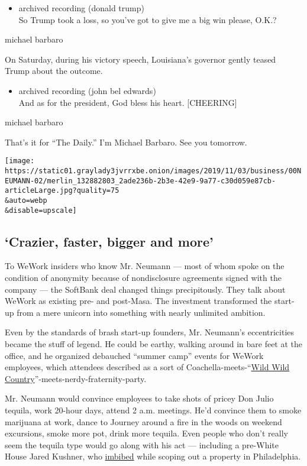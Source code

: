 \begin{itemize}
\tightlist
\item
  archived recording (donald trump)\\
  So Trump took a loss, so you've got to give me a big win please, O.K.?
\end{itemize}

michael barbaro

On Saturday, during his victory speech, Louisiana's governor gently
teased Trump about the outcome.

\begin{itemize}
\tightlist
\item
  archived recording (john bel edwards)\\
  And as for the president, God bless his heart. {[}CHEERING{]}
\end{itemize}

michael barbaro

That's it for ``The Daily.'' I'm Michael Barbaro. See you tomorrow.

\texttt{[image: https://static01.graylady3jvrrxbe.onion/images/2019/11/03/business/00NEUMANN-02/merlin\_132882803\_2ade236b-2b3e-42e9-9a77-c30d059e87cb-articleLarge.jpg?quality=75\\\&auto=webp\\\&disable=upscale]}

\hypertarget{crazier-faster-bigger-and-more}{%
\subsection{`Crazier, faster, bigger and
more'}\label{crazier-faster-bigger-and-more}}

To WeWork insiders who know Mr. Neumann --- most of whom spoke on the
condition of anonymity because of nondisclosure agreements signed with
the company --- the SoftBank deal changed things precipitously. They
talk about WeWork as existing pre- and post-Masa. The investment
transformed the start-up from a mere unicorn into something with nearly
unlimited ambition.

Even by the standards of brash start-up founders, Mr. Neumann's
eccentricities became the stuff of legend. He could be earthy, walking
around in bare feet at the office, and he organized debauched ``summer
camp'' events for WeWork employees, which attendees described as a sort
of
Coachella-meets-``\href{https://www.youtube.com/watch?v=hBLS_OM6Puk}{Wild
Wild Country}''-meets-nerdy-fraternity-party.

Mr. Neumann would convince employees to take shots of pricey Don Julio
tequila, work 20-hour days, attend 2 a.m. meetings. He'd convince them
to smoke marijuana at work, dance to Journey around a fire in the woods
on weekend excursions, smoke more pot, drink more tequila. Even people
who don't really seem the tequila type would go along with his act ---
including a pre-White House Jared Kushner, who
\href{https://www.wsj.com/articles/wework-a-20-billion-startup-fueled-by-silicon-valley-pixie-dust-1508424483}{imbibed}
while scoping out a property in Philadelphia.

